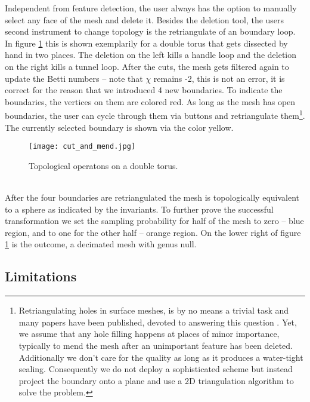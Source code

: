 Independent from feature detection, the user always has the option to manually select any face of the mesh and delete it.
Besides the deletion tool, the users second instrument to change topology is the retriangulate of an boundary loop.\\
In figure \ref{fig:cut_and_mend} this is shown exemplarily for a double torus that gets dissected by hand in two places.
The deletion on the left kills a handle loop and the deletion on the right kills a tunnel loop.
After the cuts, the mesh gets filtered again to update the Betti numbers -- note that $\chi$ remains -2, this is not an error, it is correct for the reason that we introduced 4 new boundaries.
To indicate the boundaries, the vertices on them are colored red.
As long as the mesh has open boundaries, the user can cycle through them via buttons and retriangulate them\footnote{ Retriangulating holes in surface meshes, is by no means a trivial task and many papers have been published, devoted to answering this question \citep[cf.][]{Zhao2007}. Yet, we assume that any hole filling happens at places of minor importance, typically to mend the mesh after an unimportant feature has been deleted. Additionally we don't care for the quality as long as it produces a water-tight sealing. Consequently we do not deploy a sophisticated scheme but instead project the boundary onto a plane and use a 2D triangulation algorithm to solve the problem.}.
The currently selected boundary is shown via the color yellow.\\
\begin{figure}[ht]
\centering
\texttt{[image: cut\_and\_mend.jpg]}
\caption{Topological operatons on a double torus.}
\label{fig:cut_and_mend}
\end{figure}\\
After the four boundaries are retriangulated the mesh is topologically equivalent to a sphere as indicated by the invariants.
To further prove the successful transformation we set the sampling probability for half of the mesh to zero -- blue region, and to one for the other half -- orange region.
On the lower right of figure \ref{fig:cut_and_mend} is the outcome, a decimated mesh with genus null.

\newpage
\subsection{Limitations}
\label{topstoc23}

